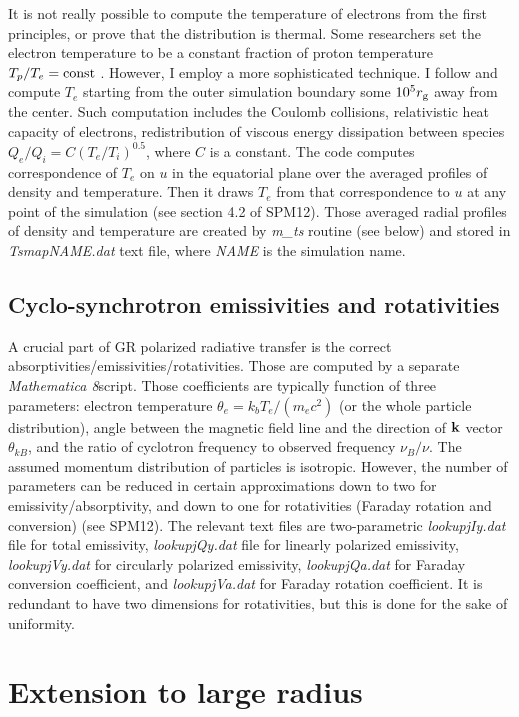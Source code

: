 \documentclass{emulateapj}
\newcommand{\mat}{\textit{Mathematica 8}}
\begin{document}
It is not really possible to compute the temperature of electrons from the first principles, or prove that the distribution is thermal. Some researchers set the electron temperature to be a constant fraction of proton temperature $T_p/T_e=\rm const$ \citep{Moscibrodzka:2009,Dexter:2010lk}. However, I employ a more sophisticated technique. I follow \citet{Sharma_heating:2007} and compute $T_e$ starting from the outer simulation boundary some $10^5r_{\rm g}$ away from the center. Such computation includes the Coulomb collisions, relativistic heat capacity of electrons, redistribution of viscous energy dissipation between species $Q_e/Q_i=C(T_e/T_i)^{0.5}$, where $C$ is a constant.
The code computes correspondence of $T_e$ on $u$ in the equatorial plane over the averaged profiles of density and temperature.
Then it draws $T_e$ from that correspondence to $u$ at any point of the simulation (see section 4.2 of SPM12).
Those averaged radial profiles of density and temperature are created by \textit{m\_ts} routine (see below) and stored in \textit{TsmapNAME.dat} text file,
where \textit{NAME} is the simulation name.

\subsection{Cyclo-synchrotron emissivities and rotativities}
A crucial part of GR polarized radiative transfer is the correct absorptivities/emissivities/rotativities.
Those are computed by a separate \mat script. Those coefficients are typically function of three parameters: 
electron temperature $\theta_e=k_b T_e/(m_e c^2)$ (or the whole particle distribution), angle between the magnetic field line and the direction of ${\bf k}$ vector
$\theta_{kB}$, and the ratio of cyclotron frequency to observed frequency $\nu_B/\nu$. The assumed momentum distribution of particles is isotropic.
However, the number of parameters can be reduced in certain approximations down to two for emissivity/absorptivity, and down to one for rotativities (Faraday rotation and conversion) (see SPM12). The relevant text files are two-parametric \textit{lookupjIy.dat} file for total emissivity, \textit{lookupjQy.dat} file for linearly polarized emissivity,
\textit{lookupjVy.dat} for circularly polarized emissivity, \textit{lookupjQa.dat} for Faraday conversion coefficient, and \textit{lookupjVa.dat} for Faraday rotation coefficient.
It is redundant to have two dimensions for rotativities, but this is done for the sake of uniformity.

\section{Extension to large radius}
\end{document}
